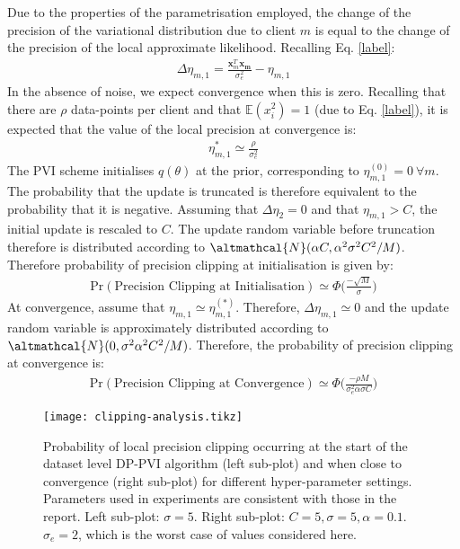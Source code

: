 Due to the properties of the parametrisation employed, the change of the precision of the variational distribution due to client $m$ is equal to the change of the precision of the local approximate likelihood. Recalling Eq. \eqref{label}:
\begin{align}
\Delta \eta_{m, 1} = \frac{\bm{x}_m ^T \bm{x_m}}{\sigma_e^2} - \eta_{m, 1}
\end{align}
In the absence of noise, we expect convergence when this is zero. Recalling that there are $\rho$ data-points per client and that $\mathbb{E}(x_{i}^2) = 1$ (due to Eq. \eqref{label}), it is expected that the value of the local precision at convergence is:
\begin{align}
\eta_{m, 1}^* \simeq \frac{\rho}{\sigma_e^2} 
\end{align}
The PVI scheme initialises $q(\theta)$ at the prior, corresponding to $\eta^{(0)}_{m, 1} = 0\ \forall m$. The probability that the update is truncated is therefore equivalent to the probability that it is negative. Assuming that $\Delta \eta_2 = 0$ and that $\eta_{m, 1} > C$,  the initial update is rescaled to $C$. The update random variable before truncation therefore is distributed according to $\altmathcal{N}(\alpha C, \alpha^2 \sigma^2 C^2/M)$. Therefore probability of precision clipping at initialisation is given by:
\begin{align}
\text{Pr}(\text{Precision Clipping at Initialisation}) \simeq \Phi \Big(\frac{-\sqrt{M} }{\sigma}\Big)
\end{align}
At convergence, assume that $\eta_{m, 1} \simeq \eta_{m, 1}^{(*)}$. Therefore, $\Delta \eta_{m, 1} \simeq 0$ and the update random variable is approximately distributed according to $\altmathcal{N}(0, \sigma^2 \alpha^2 C^2/M)$. Therefore, the probability of precision clipping at convergence is:
\begin{align}
\text{Pr}(\text{Precision Clipping at Convergence}) \simeq \Phi \Big(\frac{- \rho M }{\sigma_e^2 \alpha \sigma C}\Big)
\end{align}

\begin{figure}
	\texttt{[image: clipping-analysis.tikz]}
	\centering
	\caption{\label{fig:invalid-clipping} Probability of local precision clipping occurring at the start of the dataset level DP-PVI algorithm (left sub-plot) and when close to convergence (right sub-plot) for different hyper-parameter settings. Parameters used in experiments are consistent with those in the report. Left sub-plot: $\sigma = 5$. Right sub-plot: $C=5, \sigma=5, \alpha = 0.1$. $\sigma_e = 2$, which is the worst case of values considered here.}
\end{figure}

